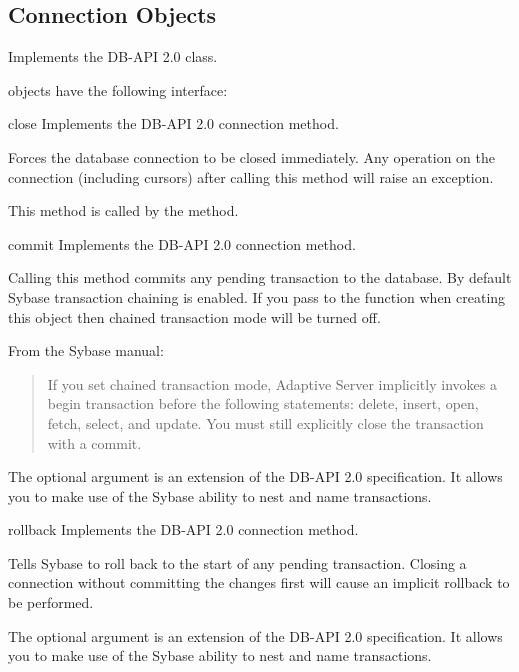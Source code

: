 \subsection{Connection Objects}

Implements the DB-API 2.0  class.

 objects have the following interface:

\begin{methoddesc}[Connection]{close}{}
Implements the DB-API 2.0 connection  method.

Forces the database connection to be closed immediately.  Any
operation on the connection (including cursors) after calling this
method will raise an exception.

This method is called by the  method.
\end{methoddesc}

\begin{methoddesc}[Connection]{commit}{}
Implements the DB-API 2.0 connection  method.

Calling this method commits any pending transaction to the database.
By default Sybase transaction chaining is enabled.  If you pass
 to the  function when
creating this  object then chained transaction mode
will be turned off.

From the Sybase manual:
\begin{quote}
If you set chained transaction mode, Adaptive Server implicitly
invokes a begin transaction before the following statements: delete,
insert, open, fetch, select, and update. You must still explicitly
close the transaction with a commit.
\end{quote}

The optional  argument is an extension of the DB-API 2.0
specification.  It allows you to make use of the Sybase ability to
nest and name transactions.
\end{methoddesc}

\begin{methoddesc}[Connection]{rollback}{}
Implements the DB-API 2.0 connection  method.

Tells Sybase to roll back to the start of any pending transaction.
Closing a connection without committing the changes first will cause
an implicit rollback to be performed.

The optional  argument is an extension of the DB-API 2.0
specification.  It allows you to make use of the Sybase ability to
nest and name transactions.
\end{methoddesc}

